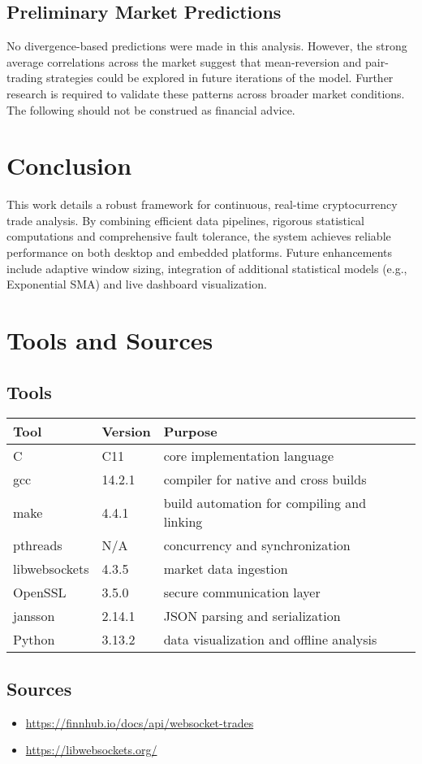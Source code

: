 \documentclass{article}
\begin{document}
\subsection{Preliminary Market Predictions} No divergence-based predictions were made in this analysis. However, the strong average correlations across the market suggest that mean-reversion and pair-trading strategies could be explored in future iterations of the model. Further research is required to validate these patterns across broader market conditions. The following should not be construed as financial advice.

\section{Conclusion}
This work details a robust framework for continuous, real-time cryptocurrency trade analysis. By combining efficient data pipelines, rigorous statistical computations and comprehensive fault tolerance, the system achieves reliable performance on both desktop and embedded platforms. Future enhancements include adaptive window sizing, integration of additional statistical models (e.g., Exponential SMA) and live dashboard visualization.

\section{Tools and Sources}

\subsection*{Tools}
\begin{tabularx}{\textwidth}{llX}
\toprule
Tool & Version & Purpose \\
\midrule
C             & C11     & core implementation language \\
gcc           & 14.2.1  & compiler for native and cross builds \\
make          & 4.4.1   & build automation for compiling and linking \\
pthreads      & N/A     & concurrency and synchronization \\
libwebsockets & 4.3.5   & market data ingestion \\
OpenSSL       & 3.5.0   & secure communication layer \\
jansson       & 2.14.1  & JSON parsing and serialization \\
Python        & 3.13.2  & data visualization and offline analysis \\
\bottomrule
\end{tabularx}

\vspace{1em}

\subsection*{Sources}
\begin{itemize}
  \item \url{https://finnhub.io/docs/api/websocket-trades}
  \item \url{https://libwebsockets.org/}
\end{itemize}
\end{document}
